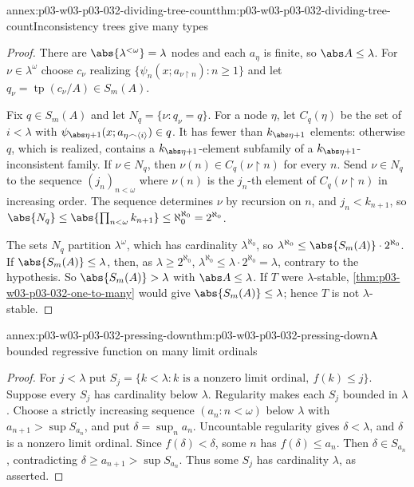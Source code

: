 \begin{annexitem}{annex:p03-w03-p03-032-dividing-tree-count}{thm:p03-w03-p03-032-dividing-tree-count}{Inconsistency trees give many types}
\begin{proof}
There are \(\abs{\lambda^{<\omega}}=\lambda\) nodes and each \(a_\eta\) is
finite, so \(\abs A\leq\lambda\).  For \(\nu\in\lambda^\omega\) choose
\(c_\nu\) realizing \(\{\psi_n(x;a_{\nu\mathbin{\upharpoonright}n}):n\geq1\}\)
and let \(q_\nu=\operatorname{tp}(c_\nu/A)\in S_m(A)\).

Fix \(q\in S_m(A)\) and let \(N_q=\{\nu:q_\nu=q\}\).  For a node \(\eta\),
let \(C_q(\eta)\) be the set of \(i<\lambda\) with
\(\psi_{\abs\eta+1}(x;a_{\eta\frown\langle i\rangle})\in q\).  It has fewer
than \(k_{\abs\eta+1}\) elements: otherwise \(q\), which is realized,
contains a \(k_{\abs\eta+1}\)-element subfamily of a
\(k_{\abs\eta+1}\)-inconsistent family.  If \(\nu\in N_q\), then
\(\nu(n)\in C_q(\nu\mathbin{\upharpoonright}n)\) for every \(n\).  Send
\(\nu\in N_q\) to the sequence \((j_n)_{n<\omega}\) where \(\nu(n)\) is the
\(j_n\)-th element of \(C_q(\nu\mathbin{\upharpoonright}n)\) in increasing
order.  The sequence determines \(\nu\) by recursion on \(n\), and
\(j_n<k_{n+1}\), so \(\abs{N_q}\leq\abs{\prod_{n<\omega}k_{n+1}}
\leq\aleph_0^{\aleph_0}=2^{\aleph_0}\).

The sets \(N_q\) partition \(\lambda^\omega\), which has cardinality
\(\lambda^{\aleph_0}\), so
\(\lambda^{\aleph_0}\leq\abs{S_m(A)}\cdot2^{\aleph_0}\).  If
\(\abs{S_m(A)}\leq\lambda\), then, as \(\lambda\geq2^{\aleph_0}\),
\(\lambda^{\aleph_0}\leq\lambda\cdot2^{\aleph_0}=\lambda\), contrary to the
hypothesis.  So \(\abs{S_m(A)}>\lambda\) with \(\abs A\leq\lambda\).  If
\(T\) were \(\lambda\)-stable, \cref{thm:p03-w03-p03-032-one-to-many} would
give \(\abs{S_m(A)}\leq\lambda\); hence \(T\) is not \(\lambda\)-stable.
\end{proof}
\end{annexitem}

\begin{annexitem}{annex:p03-w03-p03-032-pressing-down}{thm:p03-w03-p03-032-pressing-down}{A bounded regressive function on many limit ordinals}
\begin{proof}
For \(j<\lambda\) put
\(S_j=\{k<\lambda:k\text{ is a nonzero limit ordinal},\ f(k)\leq j\}\).
Suppose every \(S_j\) has cardinality below \(\lambda\).  Regularity makes
each \(S_j\) bounded in \(\lambda\).  Choose a strictly increasing sequence
\((a_n:n<\omega)\) below \(\lambda\) with
\(a_{n+1}>\sup S_{a_n}\), and put \(\delta=\sup_n a_n\).
Uncountable regularity gives \(\delta<\lambda\), and \(\delta\) is a
nonzero limit ordinal.  Since \(f(\delta)<\delta\), some \(n\) has
\(f(\delta)\leq a_n\).  Then \(\delta\in S_{a_n}\), contradicting
\(\delta\geq a_{n+1}>\sup S_{a_n}\).  Thus some \(S_j\) has cardinality
\(\lambda\), as asserted.
\end{proof}
\end{annexitem}

